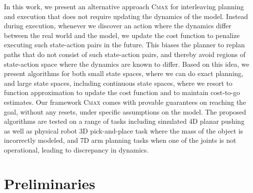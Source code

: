 In this work, we present an alternative approach \textsc{Cmax} for
interleaving planning and 
execution that does not require updating
the dynamics of the model. Instead during execution, whenever we discover an action
where the dynamics differ between the real world and the model, we
update the cost function to penalize executing such state-action pairs
in the future. This biases the planner to replan paths that do not
consist of such state-action pairs, and thereby avoid regions of
state-action space where the dynamics are known to differ. Based on
this idea, we present
algorithms for both small state spaces, where we can do
exact planning, and large state spaces, including continuous state
spaces, where we resort to function 
approximation to update the cost function and to maintain cost-to-go
estimates.
Our framework \textsc{Cmax} comes with provable guarantees on
reaching 
the goal, without any resets, under specific assumptions on
the model.
The proposed algorithms are tested on a range of tasks
including simulated 4D planar pushing as well as
physical robot 3D pick-and-place task where the mass of the object is
incorrectly modeled, and 7D arm planning tasks when one of the joints
is not operational, leading to discrepancy in dynamics. 


\section{Preliminaries}
\label{sec:preliminaries}

